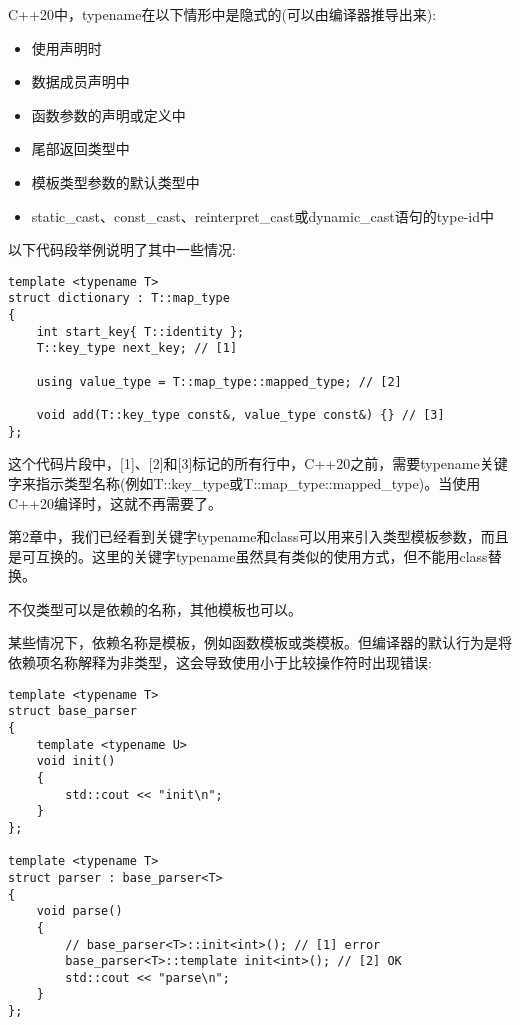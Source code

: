 C++20中，typename在以下情形中是隐式的(可以由编译器推导出来):

\begin{itemize}
\item
使用声明时

\item
数据成员声明中

\item
函数参数的声明或定义中

\item
尾部返回类型中

\item
模板类型参数的默认类型中

\item
static\_cast、const\_cast、reinterpret\_cast或dynamic\_cast语句的type-id中
\end{itemize}

以下代码段举例说明了其中一些情况:

\begin{lstlisting}[style=styleCXX]
template <typename T>
struct dictionary : T::map_type
{
	int start_key{ T::identity };
	T::key_type next_key; // [1]
	
	using value_type = T::map_type::mapped_type; // [2]
	
	void add(T::key_type const&, value_type const&) {} // [3]
};
\end{lstlisting}

这个代码片段中，[1]、[2]和[3]标记的所有行中，C++20之前，需要typename关键字来指示类型名称(例如T::key\_type或T::map\_type::mapped\_type)。当使用C++20编译时，这就不再需要了。

\begin{tcolorbox}[breakable,enhanced jigsaw,colback=blue!5!white,colframe=blue!75!black,title={Note}]
第2章中，我们已经看到关键字typename和class可以用来引入类型模板参数，而且是可互换的。这里的关键字typename虽然具有类似的使用方式，但不能用class替换。
\end{tcolorbox}

不仅类型可以是依赖的名称，其他模板也可以。


某些情况下，依赖名称是模板，例如函数模板或类模板。但编译器的默认行为是将依赖项名称解释为非类型，这会导致使用小于比较操作符时出现错误:

\begin{lstlisting}[style=styleCXX]
template <typename T>
struct base_parser
{
	template <typename U>
	void init()
	{
		std::cout << "init\n";
	}
};

template <typename T>
struct parser : base_parser<T>
{
	void parse()
	{
		// base_parser<T>::init<int>(); // [1] error
		base_parser<T>::template init<int>(); // [2] OK
		std::cout << "parse\n";
	}
};
\end{lstlisting}

